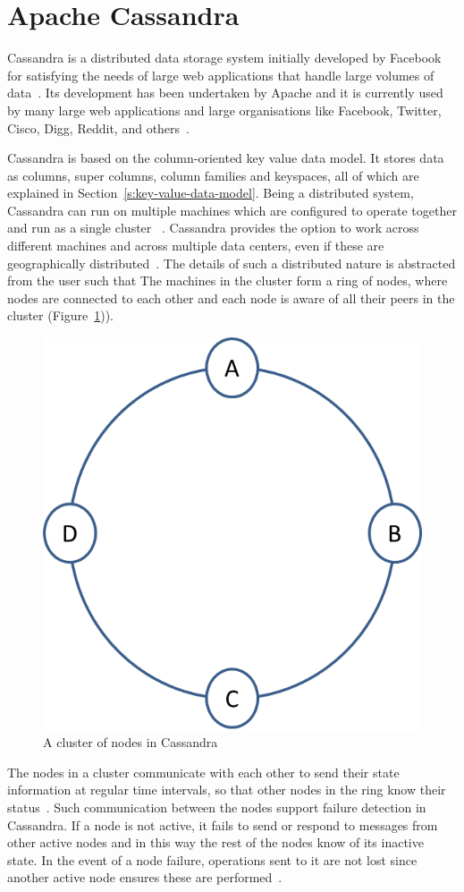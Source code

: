 \section{Apache Cassandra} \label{s:Background-Cassandra}

Cassandra is a distributed data storage system initially developed by Facebook
for satisfying the needs of large web applications that handle large
volumes of data~\citep{BOOK}. 
Its development has been undertaken by Apache  and it is  currently used by
many large web applications and large organisations like Facebook,  Twitter, 
Cisco,  Digg,  Reddit, and others~\citep{datastaxB}. 

Cassandra is based on the column-oriented key value data model. It stores data
as columns,  super columns,  column families and keyspaces, all of which are
explained in Section~\ref{s:key-value-data-model}. Being a distributed
system, Cassandra can run on multiple machines which are
configured to operate together and run as a single
cluster~\citep{datastax,BOOK} .
Cassandra provides the option  to work across different machines and across
multiple data centers,  even if these  are geographically
distributed~\citep{BOOK}.
The details of such a distributed nature is abstracted from  the user such that 
The machines in the cluster form a ring of nodes,  where
nodes are connected to each other and each node is aware of all their peers in
the cluster (Figure~\ref{f:cassandra-cluster})).


\begin{figure}[h] \centering 
\includegraphics[width=.3\textwidth]{./figure/Background/CassandraCluster.png}
	\caption{A cluster of nodes in Cassandra}\label{f:cassandra-cluster}
\end{figure}

The nodes in a cluster communicate with each other to send their state
information at regular time intervals,  so that other nodes in the ring  know
their status~\citep{cassandra,BOOK}. Such communication
between the nodes support failure detection in Cassandra.
If a node is not active,  it fails to send or respond to messages from other
active nodes and in this way the rest of the nodes  know of its inactive state.
In the event of a node failure,
operations sent to it are not lost since another active node ensures these are
performed~\citep{cassandra}.

